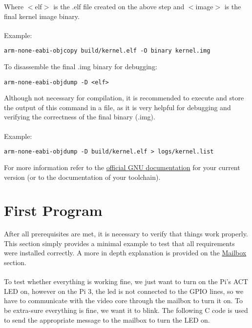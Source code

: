 \documentclass[12pt]{book}
\begin{document}
Where $<$elf$>$ is the .elf file created on the above step and $<$image$>$ is the final kernel image binary. 
\\~\\
Example:
\begin{lstlisting}[style = bash, xleftmargin=0\textwidth]
	arm-none-eabi-objcopy build/kernel.elf -O binary kernel.img
\end{lstlisting}

To \hypertarget{disassemble}{disassemble} the final .img binary for debugging:
\begin{lstlisting}[style = bash, xleftmargin=0\textwidth]
	arm-none-eabi-objdump -D <elf>
\end{lstlisting}

Although not necessary for compilation, it is recommended to execute and store the output of this command in a file, as it is very helpful for debugging and verifying the correctness of the final binary (.img).
\\~\\
Example:
\begin{lstlisting}[style = bash, xleftmargin=0\textwidth]
	arm-none-eabi-objdump -D build/kernel.elf > logs/kernel.list
\end{lstlisting}

For more information refer to the \href{https://gcc.gnu.org/onlinedocs/}{official GNU documentation} for your current version (or to the documentation of your toolchain).

\section{First Program}
\label{sec:frist program}

After all prerequisites are met, it is necessary to verify that things work properly. This section simply provides a minimal example to test that all requirements were installed correctly. A more in depth explanation is provided on the \hyperref[sec:mailbox]{Mailbox} section.
\\~\\
To test whether everything is working fine, we just want to turn on the Pi's ACT LED on, however on the Pi 3, the led is not connected to the GPIO lines, so we have to communicate with the video core through the mailbox to turn it on. To be extra-sure everything is fine, we want it to blink. The following C code is used to send the appropriate message to the mailbox to turn the LED on.
\end{document}

